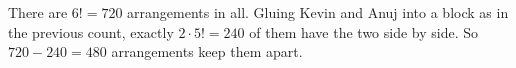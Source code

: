 There are $6!=720$ arrangements in all. Gluing Kevin and Anuj into a block as in the previous count, exactly $2\cdot5!=240$ of them have the two side by side. So $720-240=\boxed{480}$ arrangements keep them apart.
